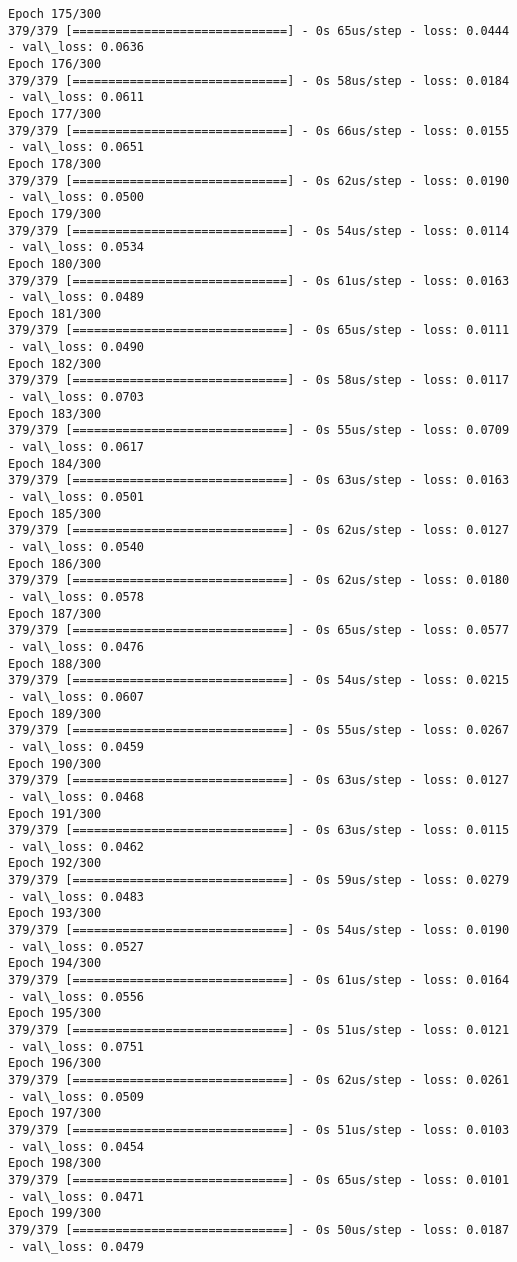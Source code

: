 \documentclass[11pt]{article}
\begin{document}
\begin{Verbatim}[commandchars=\\\{\}]
Epoch 175/300
379/379 [==============================] - 0s 65us/step - loss: 0.0444 - val\_loss: 0.0636
Epoch 176/300
379/379 [==============================] - 0s 58us/step - loss: 0.0184 - val\_loss: 0.0611
Epoch 177/300
379/379 [==============================] - 0s 66us/step - loss: 0.0155 - val\_loss: 0.0651
Epoch 178/300
379/379 [==============================] - 0s 62us/step - loss: 0.0190 - val\_loss: 0.0500
Epoch 179/300
379/379 [==============================] - 0s 54us/step - loss: 0.0114 - val\_loss: 0.0534
Epoch 180/300
379/379 [==============================] - 0s 61us/step - loss: 0.0163 - val\_loss: 0.0489
Epoch 181/300
379/379 [==============================] - 0s 65us/step - loss: 0.0111 - val\_loss: 0.0490
Epoch 182/300
379/379 [==============================] - 0s 58us/step - loss: 0.0117 - val\_loss: 0.0703
Epoch 183/300
379/379 [==============================] - 0s 55us/step - loss: 0.0709 - val\_loss: 0.0617
Epoch 184/300
379/379 [==============================] - 0s 63us/step - loss: 0.0163 - val\_loss: 0.0501
Epoch 185/300
379/379 [==============================] - 0s 62us/step - loss: 0.0127 - val\_loss: 0.0540
Epoch 186/300
379/379 [==============================] - 0s 62us/step - loss: 0.0180 - val\_loss: 0.0578
Epoch 187/300
379/379 [==============================] - 0s 65us/step - loss: 0.0577 - val\_loss: 0.0476
Epoch 188/300
379/379 [==============================] - 0s 54us/step - loss: 0.0215 - val\_loss: 0.0607
Epoch 189/300
379/379 [==============================] - 0s 55us/step - loss: 0.0267 - val\_loss: 0.0459
Epoch 190/300
379/379 [==============================] - 0s 63us/step - loss: 0.0127 - val\_loss: 0.0468
Epoch 191/300
379/379 [==============================] - 0s 63us/step - loss: 0.0115 - val\_loss: 0.0462
Epoch 192/300
379/379 [==============================] - 0s 59us/step - loss: 0.0279 - val\_loss: 0.0483
Epoch 193/300
379/379 [==============================] - 0s 54us/step - loss: 0.0190 - val\_loss: 0.0527
Epoch 194/300
379/379 [==============================] - 0s 61us/step - loss: 0.0164 - val\_loss: 0.0556
Epoch 195/300
379/379 [==============================] - 0s 51us/step - loss: 0.0121 - val\_loss: 0.0751
Epoch 196/300
379/379 [==============================] - 0s 62us/step - loss: 0.0261 - val\_loss: 0.0509
Epoch 197/300
379/379 [==============================] - 0s 51us/step - loss: 0.0103 - val\_loss: 0.0454
Epoch 198/300
379/379 [==============================] - 0s 65us/step - loss: 0.0101 - val\_loss: 0.0471
Epoch 199/300
379/379 [==============================] - 0s 50us/step - loss: 0.0187 - val\_loss: 0.0479

\end{Verbatim}
\end{document}
